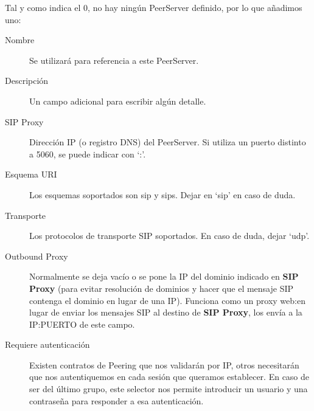 \documentclass[letterpaper,10pt,spanish]{sphinxmanual}
\begin{document}

Tal y como indica el 0, no hay ningún PeerServer definido, por lo que añadimos uno:

\begin{description}
\item[{Nombre}] \leavevmode{}\label{external_incoming_calls/peering_contracts:term-4}
Se utilizará para referencia a este PeerServer.

\item[{Descripción}] \leavevmode{}\label{external_incoming_calls/peering_contracts:term-5}
Un campo adicional para escribir algún detalle.

\item[{SIP Proxy}] \leavevmode{}\label{external_incoming_calls/peering_contracts:term-sip-proxy}
Dirección IP (o registro DNS) del PeerServer. Si utiliza un puerto        distinto a 5060, se puede indicar con `:'.

\item[{Esquema URI}] \leavevmode{}\label{external_incoming_calls/peering_contracts:term-uri-scheme}
Los esquemas soportados son sip y sips. Dejar en `sip' en caso de duda.

\item[{Transporte}] \leavevmode{}\label{external_incoming_calls/peering_contracts:term-transport}
Los protocolos de transporte SIP soportados. En caso de duda, dejar `udp'.

\item[{Outbound Proxy}] \leavevmode{}\label{external_incoming_calls/peering_contracts:term-outbound-proxy}
Normalmente se deja vacío o se pone la IP del dominio indicado en \textbf{SIP Proxy} (para evitar resolución de dominios y hacer que el mensaje SIP contenga el dominio en lugar de una IP). Funciona como un proxy web:en lugar de enviar los mensajes SIP al destino de \textbf{SIP Proxy}, los envía a la IP:PUERTO de este campo.

\item[{Requiere autenticación}] \leavevmode{}\label{external_incoming_calls/peering_contracts:term-requires-authentication}
Existen contratos de Peering que nos validarán por IP, otros necesitarán que nos autentiquemos en cada sesión que queramos establecer. En caso de ser del último grupo, este selector nos permite introducir un usuario y una contraseña para responder a esa autenticación.


\end{description}
\end{document}
